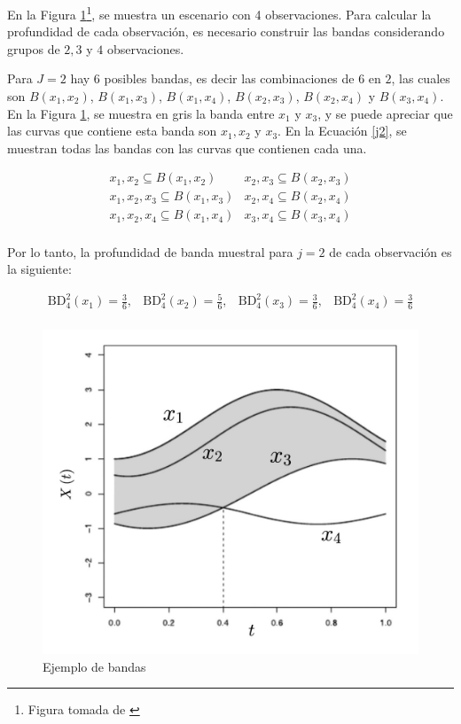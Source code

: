 \begin{ejemplo}
   En la Figura \ref{fig:CurvasX}\footnote{
Figura tomada de \cite{boxplotFun}}, se muestra un escenario con 4 observaciones. Para calcular la profundidad de cada observación, es necesario construir las bandas considerando grupos de $2, 3$ y $4$ observaciones.
    
    Para $J = 2$ hay $6$ posibles bandas, es decir las combinaciones de $6$ en $2$, las cuales son $B(x_1, x_2)$, $B(x_1, x_3)$, $B(x_1, x_4)$, $B(x_2, x_3)$, $B(x_2, x_4)$ y $B(x_3, x_4)$. En la Figura \ref{fig:CurvasX}, se muestra en gris la banda entre $x_1$ y $x_3$, y se puede apreciar que las curvas que contiene esta banda son $x_1, x_2$ y $x_3$. En la Ecuación \eqref{j2}, se muestran todas las bandas con las curvas que contienen cada una.
    
    \begin{equation}\label{j2}
        \begin{matrix}
        x_1,x_2 \subseteq  B(x_1, x_2)  & x_2,x_3 \subseteq  B(x_2, x_3) \\
        x_1,x_2, x_3 \subseteq  B(x_1, x_3)  & x_2,x_4 \subseteq  B(x_2, x_4) \\
        x_1,x_2, x_4 \subseteq  B(x_1, x_4)  & x_3,x_4 \subseteq  B(x_3, x_4) \\
    \end{matrix}
    \end{equation}

    Por lo tanto, la profundidad de banda muestral para $j = 2$ de cada observación es la siguiente:

    \begin{equation}
        \begin{matrix}
            \mathrm{BD}^{2}_4(x_1) = \frac{3}{6}, & \mathrm{BD}^{2}_4(x_2) = \frac{5}{6},  & \mathrm{BD}^{2}_4(x_3) = \frac{3}{6},  & \mathrm{BD}^{2}_4(x_4) = \frac{3}{6} \\
        \end{matrix}        
    \end{equation}
    
    \begin{figure}[H]
    \centering
    \includegraphics[width = 0.7 \textwidth]{Imagenes/WhatsApp Image 2024-04-21 at 8.06.25 PM.jpeg}
    \caption{Ejemplo de bandas}
    \label{fig:CurvasX}
\end{figure}


\end{ejemplo}
